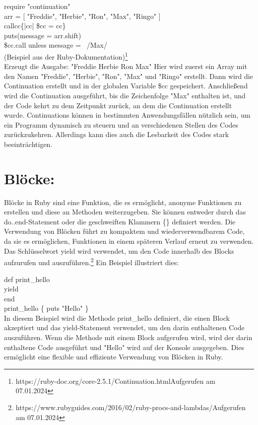 \documentclass{article}
\begin{document}
require "continuation" \\ 
arr = [ "Freddie", "Herbie", "Ron", "Max", "Ringo" ] \\ 
callcc\{|cc| \$cc = cc\} \\ 
puts(message = arr.shift) \\ 
\$cc.call unless message =~ /Max/ \\ 
(Beispiel aus der Ruby-Dokumentation)\footnote{https://ruby-doc.org/core-2.5.1/Continuation.htmlAufgerufen am 07.01.2024} \\ 
Erzeugt die Ausgabe: "Freddie Herbie Ron Max" 
Hier wird zuerst ein Array mit den Namen "Freddie", "Herbie", "Ron", "Max" und "Ringo" erstellt. Dann wird die Continuation erstellt und in der globalen Variable \$cc gespeichert. Anschließend wird die Continuation ausgeführt, bis die Zeichenfolge "Max" enthalten ist, und der Code kehrt zu dem Zeitpunkt zurück, an dem die Continuation erstellt wurde.
Continuations können in bestimmten Anwendungsfällen nützlich sein, um ein Programm dynamisch zu steuern und an verschiedenen Stellen des Codes zurückzukehren. Allerdings kann dies auch die Lesbarkeit des Codes stark beeinträchtigen.
\section*{ Blöcke:}
Blöcke in Ruby sind eine Funktion, die es ermöglicht, anonyme Funktionen zu erstellen und diese an Methoden weiterzugeben. Sie können entweder durch das do..end-Statement oder die geschweiften Klammern \{\} definiert werden. Die Verwendung von Blöcken führt zu kompaktem und wiederverwendbarem Code, da sie es ermöglichen, Funktionen in einem späteren Verlauf erneut zu verwenden. Das Schlüsselwort yield wird verwendet, um den Code innerhalb des Blocks aufzurufen und auszuführen.\footnote{https://www.rubyguides.com/2016/02/ruby-procs-and-lambdas/Aufgerufen am 07.01.2024}
Ein Beispiel illustriert dies:

def print\_hello\\ 
yield\\ 
end\\ 

print\_hello \{ puts "Hello" \}\\ 
In diesem Beispiel wird die Methode print\_hello definiert, die einen Block akzeptiert und das yield-Statement verwendet, um den darin enthaltenen Code auszuführen. Wenn die Methode mit einem Block aufgerufen wird, wird der darin enthaltene Code ausgeführt und "Hello" wird auf der Konsole ausgegeben. Dies ermöglicht eine flexible und effiziente Verwendung von Blöcken in Ruby.
\end{document}
